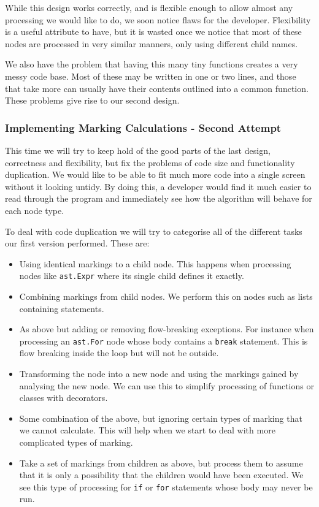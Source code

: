 \documentclass[twoside,a4paper]{report}
\begin{document}
While this design works correctly, and is flexible enough to allow almost any processing we would like to do, we soon notice flaws for the developer.
Flexibility is a useful attribute to have, but it is wasted once we notice that most of these nodes are processed in very similar manners, only using
different child names.

We also have the problem that having this many tiny functions creates a very messy code base. Most of these may be written in one or two lines, and those
that take more can usually have their contents outlined into a common function. These problems give rise to our second design.

\subsubsection{Implementing Marking Calculations - Second Attempt}

This time we will try to keep hold of the good parts of the last design, correctness and flexibility, but fix the problems of code size and functionality
duplication. We would like to be able to fit much more code into a single screen without it looking untidy. By doing this, a developer would find it much
easier to read through the program and immediately see how the algorithm will behave for each node type.

To deal with code duplication we will try to categorise all of the different tasks our first version performed. These are:

\begin{itemize}
\item Using identical markings to a child node. This happens when processing nodes like \texttt{ast.Expr} where its single child defines it exactly.
\item Combining markings from child nodes. We perform this on nodes such as lists containing statements.
\item As above but adding or removing flow-breaking exceptions. For instance when processing an \texttt{ast.For} node whose body contains a \texttt{break}
      statement. This is flow breaking inside the loop but will not be outside.
\item Transforming the node into a new node and using the markings gained by analysing the new node. We can use this to simplify processing of functions
      or classes with decorators.
\item Some combination of the above, but ignoring certain types of marking that we cannot calculate. This will help when we start to deal with more complicated
      types of marking.
\item Take a set of markings from children as above, but process them to assume that it is only a possibility that the children would have been executed. We 
      see this type of processing for \texttt{if} or \texttt{for} statements whose body may never be run.
\end{itemize}
\end{document}
